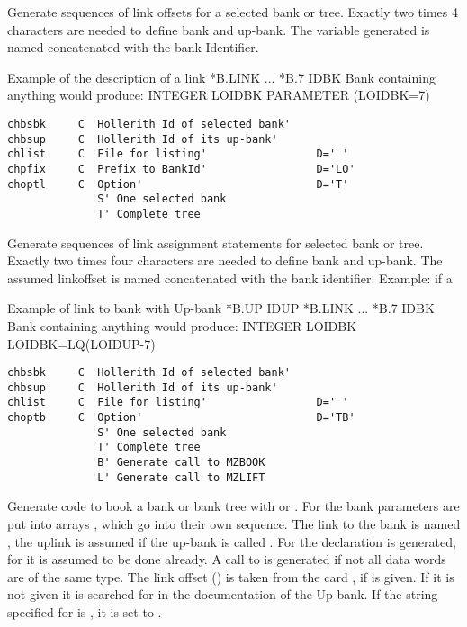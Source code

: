 Generate sequences of link offsets for a selected bank or tree.
Exactly two times 4 characters are needed to define bank and up-bank.
The variable generated is named  concatenated with the
bank Identifier.
 
\begin{XMPt}{Example of the description of a link}
         *B.LINK
         ...
         *B.7 IDBK  Bank containing anything
 {\rm would produce:}
         INTEGER LOIDBK
         PARAMETER (LOIDBK=7)
\end{XMPt}
 
\newpage

 
\begin{verbatim}
chbsbk     C 'Hollerith Id of selected bank'
chbsup     C 'Hollerith Id of its up-bank'
chlist     C 'File for listing'                 D=' '
chpfix     C 'Prefix to BankId'                 D='LO'
choptl     C 'Option'                           D='T'
             'S' One selected bank
             'T' Complete tree
\end{verbatim}
 
Generate sequences of link assignment statements for selected
bank or tree.
Exactly two times four characters are needed to define bank and up-bank.
The assumed linkoffset is named  concatenated with the
bank identifier.
Example: if a 
\par
\begin{XMPt}{Example of link to bank  with Up-bank }
         *B.UP IDUP
         *B.LINK
         ...
         *B.7  IDBK  Bank containing anything
 {\rm would produce:}
         INTEGER LOIDBK
         LOIDBK=LQ(LOIDUP-7)
\end{XMPt}
 
 
\begin{verbatim}
chbsbk     C 'Hollerith Id of selected bank'
chbsup     C 'Hollerith Id of its up-bank'
chlist     C 'File for listing'                 D=' '
choptb     C 'Option'                           D='TB'
             'S' One selected bank
             'T' Complete tree
             'B' Generate call to MZBOOK
             'L' Generate call to MZLIFT
\end{verbatim}
 
\NODOC{\begin{minipage}{\textwidth}}
Generate code to book a bank or bank tree with 
or .
For  the bank parameters are put into arrays
, which go into their own  sequence.
The link to the bank  is named , 
the uplink is assumed  if the up-bank is called .
For  the declaration  is generated, 
for  it is assumed to be done already. 
A call to  is generated if not all data
words are of the same type.
The link offset () is taken from the card , 
if  is given. 
If it is not given it is searched for in the documentation of the Up-bank. 
If the string specified for  is ,
it is set to .
 

